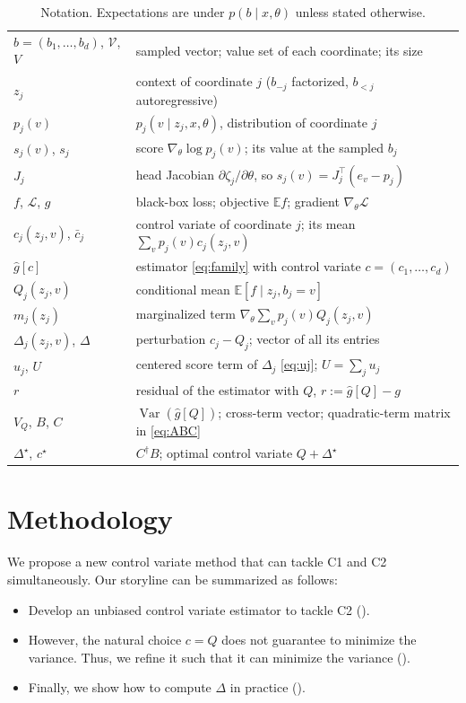 \documentclass[10pt]{article}
\providecommand{\E}{\mathbb{E}}
\providecommand{\gL}{\mathcal{L}}
\providecommand{\Var}{\operatorname{Var}}
\theoremstyle{plain}
\theoremstyle{definition}
\theoremstyle{remark}
\theoremstyle{definition}
\newcommand{\ctx}[1]{z_{#1}}                 %
\newcommand{\score}[1]{s_{#1}}               %
\newcommand{\ghat}[1]{\hat g[#1]}            %
\newcommand{\gtrue}{g}                       %
\newcommand{\Dstar}{\Delta^{\star}}
\newcommand{\cstar}{c^{\star}}
\newcommand{\VQ}{V_{Q}}
\newcommand{\pj}[1]{p_{#1}}                  %
\begin{document}
\begin{table}[t]
\centering\small
\caption{Notation. Expectations are under $p(b\mid x,\theta)$ unless stated otherwise.}
\label{tab:notation}
\begin{tabular}{ll}
\toprule
$b=(b_1,\dots,b_d)$, $\mathcal V$, $V$ & sampled vector; value set of each coordinate; its size \\
$\ctx{j}$ & context of coordinate $j$ ($b_{-j}$ factorized, $b_{<j}$ autoregressive) \\
$\pj{j}(v)$ & $\pj{j}(v\mid\ctx{j},x,\theta)$, distribution of coordinate $j$ \\
$\score{j}(v)$, $\score{j}$ & score $\nabla_\theta\log\pj{j}(v)$; its value at the sampled $b_j$ \\
$J_j$ & head Jacobian $\partial\zeta_j/\partial\theta$, so $\score{j}(v)=J_j^{\top}(e_v-\pj{j})$ \\
$f$, $\gL$, $\gtrue$ & black-box loss; objective $\E f$; gradient $\nabla_\theta\gL$ \\
$c_j(\ctx{j},v)$, $\bar c_j$ & control variate of coordinate $j$; its mean $\sum_v\pj{j}(v)c_j(\ctx{j},v)$ \\
$\ghat{c}$ & estimator \eqref{eq:family} with control variate $c=(c_1,\dots,c_d)$ \\
$Q_j(\ctx{j},v)$ & conditional mean $\E[f\mid\ctx{j},b_j=v]$ \\
$m_j(\ctx{j})$ & marginalized term $\nabla_\theta\sum_v\pj{j}(v)Q_j(\ctx{j},v)$ \\
$\Delta_j(\ctx{j},v)$, $\Delta$ & perturbation $c_j-Q_j$; vector of all its entries \\
$u_j$, $U$ & centered score term of $\Delta_j$ \eqref{eq:uj}; $U=\sum_j u_j$ \\
$r$ & residual of the estimator with $Q$, $r:=\ghat{Q}-\gtrue$ \\
$\VQ$, $B$, $C$ & $\Var(\ghat{Q})$; cross-term vector; quadratic-term matrix in \eqref{eq:ABC} \\
$\Dstar$, $\cstar$ & $C^{\dagger}B$; optimal control variate $Q+\Dstar$ \\
\bottomrule
\end{tabular}
\end{table}

\section{Methodology}\label{sec:method}
We propose a new control variate method that can tackle C1 and C2 simultaneously. Our storyline can be summarized as follows:
\begin{itemize}
    \item Develop an unbiased control variate estimator to tackle C2 ().
    \item However, the natural choice $c=Q$ does not guarantee to minimize the variance. Thus, we refine it such that it can minimize the variance ().
    \item Finally, we show how to compute $\Delta$ in practice ().
\end{itemize}
\end{document}
